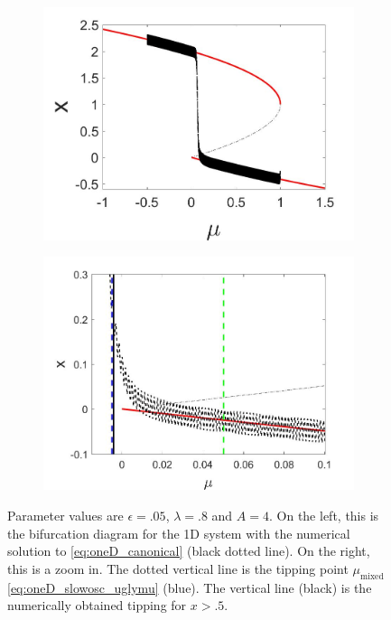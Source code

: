 \begin{figure}[H]
\centering
\begin{subfigure}{.5\textwidth}
  \centering
  \includegraphics[width=\linewidth]{oneD/slowosc_bif_diagram_small.jpg}
  \caption{}
\end{subfigure}%
\begin{subfigure}{.5\textwidth}
  \centering
  \includegraphics[width=\linewidth]{oneD/slowosc_bif_diagram_small_zoom.jpg}
  \caption{}
\end{subfigure}
\caption{Parameter values are $\epsilon=.05$, $\lambda=.8$ and $A=4$. On the left, this is the bifurcation diagram for the 1D system with the numerical solution to \eqref{eq:oneD_canonical} (black dotted line). On the right, this is a zoom in. The dotted vertical line is the tipping point $\mu_{\text{mixed}}$ \eqref{eq:oneD_slowosc_uglymu} (blue). The vertical line (black) is the numerically obtained tipping for $x>.5$.}
\label{fig:oneD_slowosc_numerical_small}
\end{figure}

